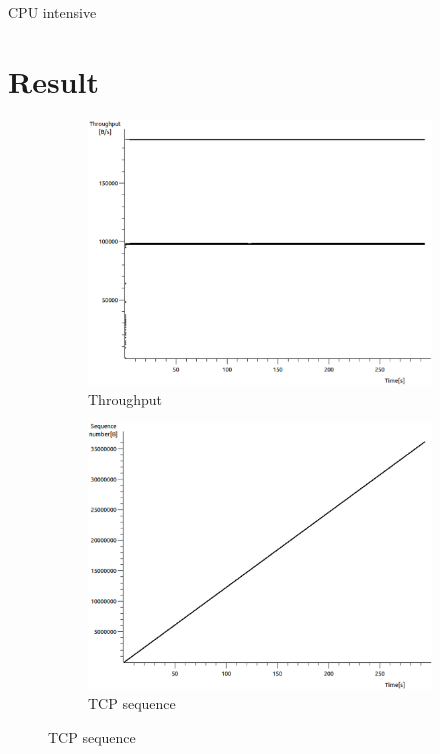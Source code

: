 \documentclass[conference,a4paper]{../../sty/IEEEtran}
\begin{document}
CPU intensive


\section{Result}

\begin{figure}
 \centering
 \begin{subfigure}[b]{0.2\textwidth}
  \includegraphics[width=\textwidth]{s1-0_thru}
  \caption{Throughput}
 \end{subfigure}
 \begin{subfigure}[b]{0.2\textwidth}
  \includegraphics[width=\textwidth]{s1-0_seq}
  \caption{TCP sequence}

\end{subfigure}
\end{figure}
\end{document}
